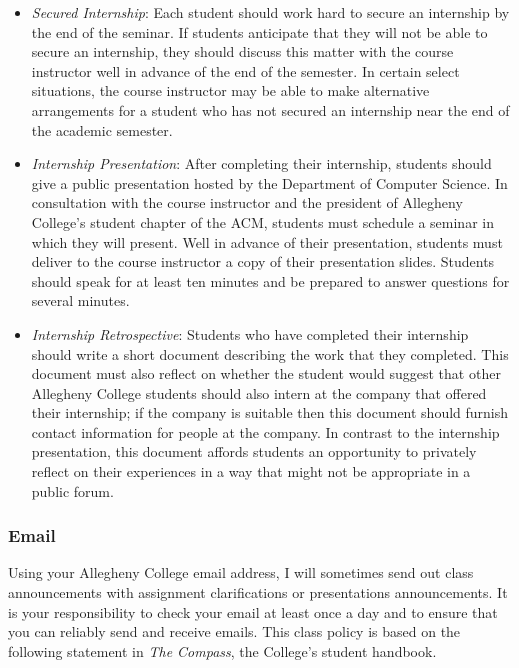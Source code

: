 \begin{itemize}
  \item {\em Secured Internship}: Each student should work hard to secure an internship by the end of the seminar.
    If students anticipate that they will not be able to secure an internship, they should discuss this matter
    with the course instructor well in advance of the end of the semester.  In certain select situations, the
    course instructor may be able to make alternative arrangements for a student who has not secured an internship
    near the end of the academic semester.

  \item {\em Internship Presentation}: After completing their internship, students should give a public presentation
    hosted by the Department of Computer Science. In consultation with the course instructor and the president of
    Allegheny College's student chapter of the ACM, students must schedule a seminar in which they will
    present.  Well in advance of their presentation, students must deliver to the course instructor a copy of their 
    presentation slides.  Students should speak for at least ten minutes and be prepared to answer questions for
    several minutes.     

  \item {\em Internship Retrospective}: Students who have completed their internship should write a short document
    describing the work that they completed.  This document must also reflect on whether the student would suggest
    that other Allegheny College students should also intern at the company that offered their internship;  if the
    company is suitable then this document should furnish contact information for people at the company.  In
    contrast to the internship presentation, this document affords students an opportunity to privately reflect on
    their experiences in a way that might not be appropriate in a public forum.

\end{itemize}

\subsubsection*{Email}

Using your Allegheny College email address, I will sometimes send out class announcements with assignment clarifications
or presentations announcements. It is your responsibility to check your email at least once a day and to ensure that you
can reliably send and receive emails. This class policy is based on the following statement in {\em The Compass}, the
College's student handbook.

